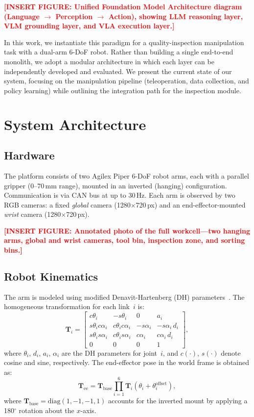 \documentclass[conference]{IEEEtran}
\newcommand{\placeholder}[1]{\textcolor{red}{\textbf{[#1]}}}
\begin{document}
\placeholder{INSERT FIGURE: Unified Foundation Model Architecture diagram (Language $\to$ Perception $\to$ Action), showing LLM reasoning layer, VLM grounding layer, and VLA execution layer.}

In this work, we instantiate this paradigm for a quality-inspection manipulation task with a dual-arm 6-DoF robot. Rather than building a single end-to-end monolith, we adopt a modular architecture in which each layer can be independently developed and evaluated. We present the current state of our system, focusing on the manipulation pipeline (teleoperation, data collection, and policy learning) while outlining the integration path for the inspection module.

\section{System Architecture}
\label{sec:system}

\subsection{Hardware}
The platform consists of two Agilex Piper 6-DoF robot arms, each with a parallel gripper (0--70\,mm range), mounted in an inverted (hanging) configuration. Communication is via CAN bus at up to 30\,Hz. Each arm is observed by two RGB cameras: a fixed \emph{global} camera (1280$\times$720\,px) and an end-effector-mounted \emph{wrist} camera (1280$\times$720\,px).

\placeholder{INSERT FIGURE: Annotated photo of the full workcell---two hanging arms, global and wrist cameras, tool bin, inspection zone, and sorting bins.}

\subsection{Robot Kinematics}
The arm is modeled using modified Denavit-Hartenberg (DH) parameters~\cite{craig2005robotics}. The homogeneous transformation for each link~$i$ is:
\begin{equation}
\label{eq:dh}
\mathbf{T}_i = \begin{bmatrix}
c\theta_i & -s\theta_i & 0 & a_i \\
s\theta_i c\alpha_i & c\theta_i c\alpha_i & -s\alpha_i & -s\alpha_i\, d_i \\
s\theta_i s\alpha_i & c\theta_i s\alpha_i & c\alpha_i & c\alpha_i\, d_i \\
0 & 0 & 0 & 1
\end{bmatrix},
\end{equation}
where $\theta_i$, $d_i$, $a_i$, $\alpha_i$ are the DH parameters for joint~$i$, and $c(\cdot)$, $s(\cdot)$ denote cosine and sine, respectively. The end-effector pose in the world frame is obtained as:
\begin{equation}
\label{eq:fk}
\mathbf{T}_\mathrm{ee} = \mathbf{T}_\mathrm{base}\prod_{i=1}^{6}\mathbf{T}_i(\theta_i + \theta_i^\mathrm{offset}),
\end{equation}
where $\mathbf{T}_\mathrm{base} = \mathrm{diag}(1, -1, -1, 1)$ accounts for the inverted mount by applying a 180$^\circ$ rotation about the $x$-axis.
\end{document}
